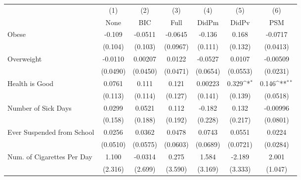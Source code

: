 {
\def\sym#1{\ifmmode^{#1}\else\(^{#1}\)\fi}
\begin{tabular}{l*{6}{c}}
\toprule
            &\multicolumn{1}{c}{(1)}&\multicolumn{1}{c}{(2)}&\multicolumn{1}{c}{(3)}&\multicolumn{1}{c}{(4)}&\multicolumn{1}{c}{(5)}&\multicolumn{1}{c}{(6)}\\
            &\multicolumn{1}{c}{None}&\multicolumn{1}{c}{BIC}&\multicolumn{1}{c}{Full}&\multicolumn{1}{c}{DidPm}&\multicolumn{1}{c}{DidPv}&\multicolumn{1}{c}{PSM}\\
\midrule
Obese       &      -0.109         &     -0.0511         &     -0.0645         &      -0.136         &       0.168         &     -0.0717         \\
            &     (0.104)         &     (0.103)         &    (0.0967)         &     (0.111)         &     (0.132)         &    (0.0413)         \\
\addlinespace
Overweight  &     -0.0110         &     0.00207         &      0.0122         &     -0.0527         &      0.0107         &    -0.00509         \\
            &    (0.0490)         &    (0.0450)         &    (0.0471)         &    (0.0654)         &    (0.0553)         &    (0.0231)         \\
\addlinespace
Health is Good&      0.0761         &       0.111         &       0.121         &     0.00223         &       0.329\sym{*}  &       0.146\sym{**} \\
            &     (0.113)         &     (0.114)         &     (0.127)         &     (0.141)         &     (0.139)         &    (0.0518)         \\
\addlinespace
Number of Sick Days&      0.0299         &      0.0521         &       0.112         &      -0.182         &       0.132         &    -0.00996         \\
            &     (0.158)         &     (0.188)         &     (0.192)         &     (0.228)         &     (0.217)         &    (0.0801)         \\
\addlinespace
Ever Suspended from School&      0.0256         &      0.0362         &      0.0478         &      0.0743         &      0.0551         &      0.0224         \\
            &    (0.0510)         &    (0.0575)         &    (0.0603)         &    (0.0689)         &    (0.0721)         &    (0.0284)         \\
\addlinespace
Num. of Cigarettes Per Day&       1.100         &     -0.0314         &       0.275         &       1.584         &      -2.189         &       2.001         \\
            &     (2.316)         &     (2.699)         &     (3.590)         &     (3.169)         &     (3.333)         &     (1.047)         \\
\bottomrule
\end{tabular}
}
